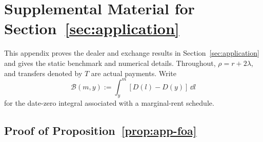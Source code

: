 \documentclass[12pt]{article}
\begin{document}
\section{Supplemental Material for Section~\ref{sec:application}}
\label{app:supp-application}

This appendix proves the dealer and exchange results in
Section~\ref{sec:application} and gives the static benchmark and numerical
details. Throughout, \(\rho=r+2\lambda\), and transfers denoted by
\(T\) are actual payments. Write
\[
  \mathcal B(m,y):=\int_y^m[D(l)-D(y)]\,\dd l
\]
for the date-zero integral associated with a marginal-rent schedule.

\subsection{Proof of Proposition~\ref{prop:app-foa}}
\label{app:proof-application}
\end{document}
